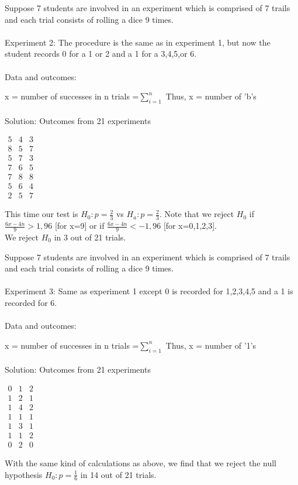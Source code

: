 \documentclass[12pt,a4paper]{article}
\theoremstyle{regla}
\theoremstyle{remark}
\theoremstyle{definition}
\theoremstyle{nonumberbreak}
\begin{document}
\begin{xmpl}
Suppose 7 students are involved in an experiment which is comprised of 7 trails and each trial consists of rolling a dice 9 times.\\
\\

Experiment 2: The procedure is the same as in experiment 1,  but now the student records 0 for a 1 or 2 and a 1 for a 3,4,5,or 6. \\\\

Data and outcomes: 

x = number of successes in n trials =$\sum_{i=1}^n$ 
Thus, x = number of 'b's\\\\

Solution:
Outcomes from 21 experiments


$\begin{matrix}
5 & 4 & 3\\
8 & 5 & 7\\
5 & 7 & 3\\ 
7 & 6 & 5\\ 
7 & 8 & 8\\ 
5 & 6 & 4\\ 
2 & 5 & 7
\end{matrix}$

This time our test is $H_0:p=\frac{2}{3}$ vs $H_a:p=\frac{2}{3}$. Note that we reject $H_0$ if $\frac{6x-4n}{9}>1,96$ [for x=9] or if $\frac{6x-4n}{9}<-1,96$ [for x=0,1,2,3]. \\

We reject $H_0$ in 3 out of 21 trials.
\end{xmpl}
\begin{xmpl}
Suppose 7 students are involved in an experiment which is comprised of 7 trails and each trial consists of rolling a dice 9 times.\\
\\

Experiment 3: Same as experiment 1 except 0 is recorded for 1,2,3,4,5 and a 1 is recorded for 6. \\
\\
Data and outcomes: 

x = number of successes in n trials =$\sum_{i=1}^n$ 
Thus, x = number of '1's \\\\

Solution:
Outcomes from 21 experiments

$\begin{matrix}
0 & 1 & 2\\
1 & 2 & 1\\
1 & 4 & 2\\ 
1 & 1 & 1\\
1 & 3 & 1\\ 
1 & 1 & 2\\ 
0 & 2 & 0
\end{matrix}$

With the same kind of calculations as above, we find that we reject the null hypothesis $H_0:p=\frac{1}{6}$ in 14 out of 21 trials. 
\end{xmpl}
\end{document}
